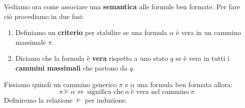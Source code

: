 Vediamo ora come associare una \textbf{semantica} alle formule ben formate. Per fare ciò
procediamo in due fasi:
\begin{enumerate}
    \item Definiamo un \textbf{criterio} per stabilire se una formula $\alpha$ è vera in
          un cammino massimale $\pi$.
    \item Diciamo che la formula è \textbf{vera} rispetto a uno stato $q$ se è vera in
          tutti i \textbf{cammini massimali} che partono da $q$.
\end{enumerate}
Fissiamo quindi un cammino generico $\pi$ e $\alpha$ una formula ben formata allora:
\begin{equation}
    \pi \vDash \alpha \iff \ \text{significa che} \ \alpha \ \text{è vera nel cammino}
    \ \pi
\end{equation}
Definiremo la relazione $\vDash$ per induzione.
